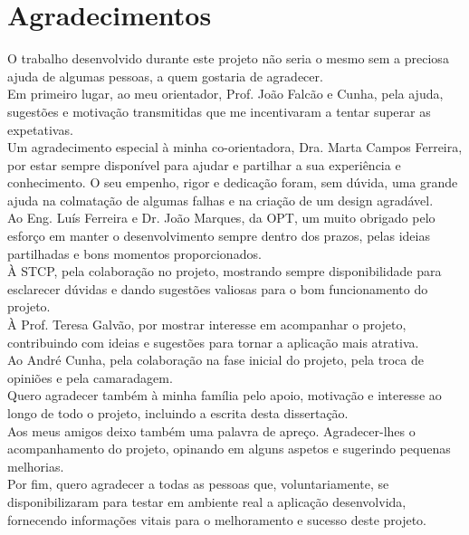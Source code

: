 \chapter*{Agradecimentos}

O trabalho desenvolvido durante este projeto não seria o mesmo sem a preciosa ajuda de algumas pessoas, a quem gostaria de agradecer.
\\Em primeiro lugar, ao meu orientador, Prof. João Falcão e Cunha, pela ajuda, sugestões e motivação transmitidas que me incentivaram a tentar superar as expetativas.
\\Um agradecimento especial à minha co-orientadora, Dra. Marta Campos Ferreira, por estar sempre disponível para ajudar e partilhar a sua experiência e conhecimento. O seu empenho, rigor e dedicação foram, sem dúvida, uma grande ajuda na colmatação de algumas falhas e na criação de um design agradável.
\\Ao Eng. Luís Ferreira e Dr. João Marques, da OPT, um muito obrigado pelo esforço em manter o desenvolvimento sempre dentro dos prazos, pelas ideias partilhadas e bons momentos proporcionados.
\\À STCP, pela colaboração no projeto, mostrando sempre disponibilidade para esclarecer dúvidas e dando sugestões valiosas para o bom funcionamento do projeto.
\\À Prof. Teresa Galvão, por mostrar interesse em acompanhar o projeto, contribuindo com ideias e sugestões para tornar a aplicação mais atrativa.
\\Ao André Cunha, pela colaboração na fase inicial do projeto, pela troca de opiniões e pela camaradagem.
\\Quero agradecer também à minha família pelo apoio, motivação e interesse ao longo de todo o projeto, incluindo a escrita desta dissertação.
\\Aos meus amigos deixo também uma palavra de apreço. Agradecer-lhes o acompanhamento do projeto, opinando em alguns aspetos e sugerindo pequenas melhorias.
\\Por fim, quero agradecer a todas as pessoas que, voluntariamente, se disponibilizaram para testar em ambiente real a aplicação desenvolvida, fornecendo informações vitais para o melhoramento e sucesso deste projeto.

\vspace{10mm}
